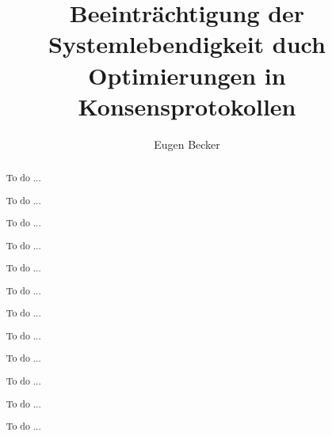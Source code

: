 \documentclass[nonacm,sigconf,natbib=false]{acmart}
\begin{document}
\title{Beeinträchtigung der Systemlebendigkeit duch Optimierungen in Konsensprotokollen} %

\author{Eugen Becker}

\renewcommand{\shortauthors}{Eugen Becker}

\renewcommand{\abstractname}{Kurzfassung}

\renewcommand{\refname}{Literaturverzeichnis}

\makeatletter
\renewcommand\subsubsection{\@startsection{subsubsection}{3}{0pt}%
    {-\baselineskip}%
    {0.2\baselineskip}%
    {\normalfont\normalsize\bfseries}}
\makeatother

\begin{abstract}
  To do ...

  To do ...

  To do ...

  To do ...

  To do ...

  To do ...

  To do ...

  To do ...

  To do ...

  To do ...

  To do ...

  To do ...
\end{abstract}
\end{document}
